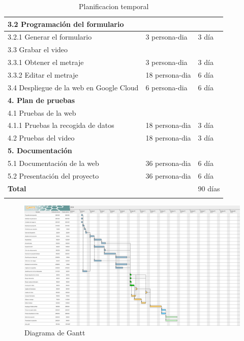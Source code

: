 \documentclass{report}
\begin{document}
\begin{center}
\begin{longtable}{|p{7cm}|p{3cm}|p{3cm}|}
                \hline
                3.2 Programación del formulario\\
                \hline
                3.2.1 Generar el formulario & 3 persona-dia & 3 día\\
                \hline
                3.3 Grabar el video\\
                \hline
                3.3.1 Obtener el metraje & 3 persona-dia & 3 día\\
                \hline
                3.3.2 Editar el metraje & 18 persona-dia & 6 día\\
                \hline
                3.4 Despliegue de la web en Google Cloud & 6 persona-dia & 6 día\\
                \hline
                \textbf{4. Plan de pruebas} &  & \\
                \hline
                4.1 Pruebas de la web & & \\
                \hline
                4.1.1 Pruebas la recogida de datos & 18 persona-dia & 3 día\\
                \hline
                4.2 Pruebas del video & 18 persona-dia & 3 día\\
                \hline
                \textbf{5. Documentación} &  & \\
                \hline
                5.1 Documentación de la web & 36 persona-dia & 6 día\\
                \hline
                5.2 Presentación del proyecto & 36 persona-dia & 6 día\\
                \hline
                \hline
                \textbf{Total} &  & 90 días\\
                \hline
                \caption{Planificacion temporal}
            \end{longtable}
            \begin{figure}[H]
                \centering
                \includegraphics[width=1\textwidth]{./img/gantt.png}
                \caption{Diagrama de Gantt}
            \end{figure}
        \end{center}
\end{document}
